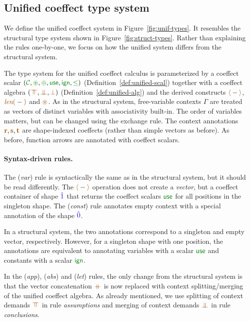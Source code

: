 \subsection{Unified coeffect type system}
\label{sec:further-types}
We define the unified coeffect system in Figure~\ref{fig:unif-types}. It resembles the structural
type system shown in Figure~\ref{fig:struct-types}. Rather than explaining the rules one-by-one, we
focus on how the unified system differs from the structural system.

The type system for the unified coeffect calculus is parameterized by a coeffect scalar
$(\C, \cseq, \cpar, \cunit, \czero, \cleq)$ (Definition~\ref{def:unified-scal}) together with a
coeffect algebra $(\azip, \apar, \azero)$ (Definition~\ref{def:unified-alg})
and the derived constructs $\alift{-}$, $\alen{-}$ and $\aseq$.
As in the structural system, free-variable contexts $\Gamma$ are treated as vectors of distinct
variables with associativity built-in. The order of variables matters, but can be changed
using the exchange rule. The context annotations $\aclrd{\textbf{r}}, \aclrd{\textbf{s}}, \aclrd{\textbf{t}}$
are shape-indexed coeffects (rather than simple vectors as before). As before, function arrows
are annotated with coeffect scalars.

\paragraph{Syntax-driven rules.}
The (\emph{var}) rule is syntactically the same as in the structural system, but it should be read
differently. The $\alift{-}$ operation does not create a \emph{vector}, but a coeffect container
of shape $\sunit$ that returns the coeffect scalars $\cunit$ for all positions in the singleton shape.
The (\emph{const}) rule annotates empty context with a special annotation of the shape $\sempty$.

In a structural system, the two annotations correspond to a singleton and empty vector, respectively.
However, for a singleton shape with one position, the annotations are equivalent to annotating
variables with a scalar $\cunit$ and constants with a scalar $\czero$.

In the (\emph{app}), (\emph{abs}) and (\emph{let}) rules, the only change from the structural
system is that the vector concatenation $\atimes$ is now replaced with context splitting/merging
of the unified coeffect algebra. As already mentioned, we use splitting of context demands $\azip$
in rule \emph{assumptions} and merging of context demands $\apar$ in rule \emph{conclusions}.

